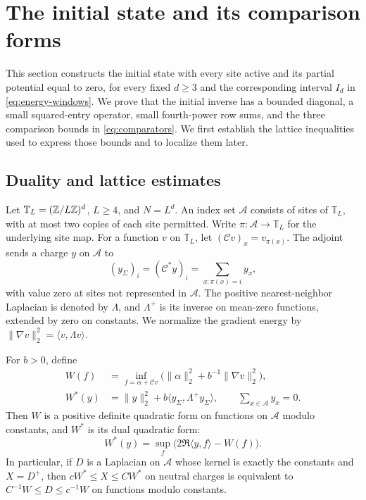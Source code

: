 \section{The initial state and its comparison forms}
\label{sec:initialization}

This section constructs the initial state with every site active and its
partial potential equal to zero, for every fixed $d\ge3$ and the
corresponding interval $I_d$ in \eqref{eq:energy-windows}. We prove that the initial inverse has a
bounded diagonal, a small squared-entry operator, small fourth-power row
sums, and the three comparison bounds in \eqref{eq:comparators}. We first establish the lattice
inequalities used to express those bounds and to localize them later.

\subsection{Duality and lattice estimates}

Let $\mathbb T_L=(\mathbb Z/L\mathbb Z)^d$, $L\ge4$, and $N=L^d$. An index set
$\mathcal A$ consists of sites of $\mathbb T_L$, with at most two copies
of each site permitted.  Write $\pi:\mathcal A\to\mathbb T_L$ for the
underlying site map.  For a function $v$ on $\mathbb T_L$, let
$(\mathcal Cv)_x=v_{\pi(x)}$.  The adjoint sends a charge $y$ on
$\mathcal A$ to
\[
 (y_\Sigma)_i=(\mathcal C^*y)_i
 =\sum_{x:\pi(x)=i}y_x,
\]
with value zero at sites not represented in $\mathcal A$.
The positive nearest-neighbor Laplacian is denoted by $\Lambda$, and
$\Lambda^+$ is its inverse on mean-zero functions, extended by zero on
constants.  We normalize the gradient energy by
$\|\nabla v\|_2^2=\langle v,\Lambda v\rangle$.

\begin{lemma}\label{lem:dual-forms}
For $b>0$, define
\[
 \begin{split}
 W(f)&=\inf_{f=\alpha+\mathcal Cv}
       \bigl(\|\alpha\|_2^2+b^{-1}\|\nabla v\|_2^2\bigr),\\
 W^*(y)&=\|y\|_2^2+
       b\langle y_\Sigma,\Lambda^+y_\Sigma\rangle,
       \qquad \sum_{x\in\mathcal A}y_x=0.
 \end{split}
\]
Then $W$ is a positive definite quadratic form on functions on
$\mathcal A$ modulo constants, and $W^*$ is its dual quadratic form:
\[
 W^*(y)=\sup_f\bigl(2\Re\langle y,f\rangle-W(f)\bigr).
\]
In particular, if $D$ is a Laplacian on $\mathcal A$ whose kernel is
exactly the constants and $X=D^+$, then
$cW^*\le X\le CW^*$ on neutral charges is equivalent to
$C^{-1}W\le D\le c^{-1}W$ on functions modulo constants.
\end{lemma}

